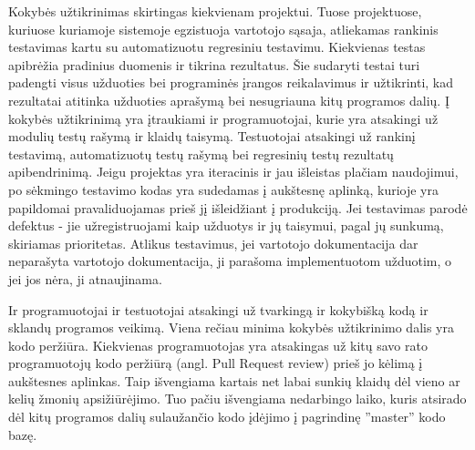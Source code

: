 \documentclass{VUMIFPSkursinis}
\begin{document}
	Kokybės užtikrinimas skirtingas kiekvienam projektui.
	Tuose projektuose, kuriuose kuriamoje sistemoje egzistuoja vartotojo sąsaja, atliekamas rankinis testavimas kartu su automatizuotu regresiniu testavimu. Kiekvienas testas apibrėžia pradinius duomenis ir tikrina rezultatus. Šie sudaryti testai turi padengti visus užduoties bei programinės įrangos reikalavimus ir užtikrinti, kad rezultatai atitinka užduoties aprašymą bei nesugriauna kitų programos dalių.
	Į kokybės užtikrinimą yra įtraukiami ir programuotojai, kurie yra atsakingi už modulių testų rašymą ir klaidų taisymą.
	Testuotojai atsakingi už rankinį testavimą, automatizuotų testų rašymą bei regresinių testų rezultatų apibendrinimą.
	Jeigu projektas yra iteracinis ir jau išleistas plačiam naudojimui, po sėkmingo testavimo kodas yra sudedamas į aukštesnę aplinką, kurioje yra papildomai pravaliduojamas prieš jį išleidžiant į produkciją.
	Jei testavimas parodė defektus - jie užregistruojami kaip užduotys ir jų taisymui, pagal jų sunkumą, skiriamas prioritetas. 
Atlikus testavimus, jei vartotojo dokumentacija dar neparašyta vartotojo dokumentacija, ji parašoma implementuotom užduotim, o jei jos nėra, ji atnaujinama.
	\par
	Ir programuotojai ir testuotojai atsakingi už tvarkingą ir kokybišką kodą ir sklandų programos veikimą.
	Viena rečiau minima kokybės užtikrinimo dalis yra kodo peržiūra.
	Kiekvienas programuotojas yra atsakingas už kitų savo rato programuotojų kodo peržiūrą (angl. Pull Request review) prieš jo kėlimą į aukštesnes aplinkas.
	Taip išvengiama kartais net labai sunkių klaidų dėl vieno ar kelių žmonių apsižiūrėjimo.
	Tuo pačiu išvengiama nedarbingo laiko, kuris atsirado dėl kitų programos dalių sulaužančio kodo įdėjimo į pagrindinę ''master'' kodo bazę.
	\newpage
\end{document}
